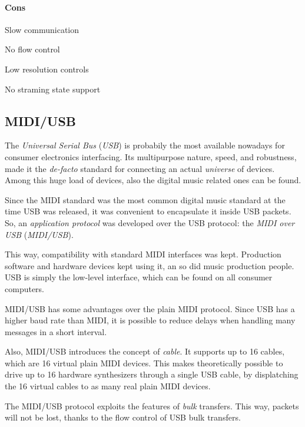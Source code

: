\documentclass[a4paper,10pt]{article}
\begin{document}
\begin{multicols}{2}
\paragraph{Cons}
\begin{itemize*}
	\item Slow communication
	\item No flow control
	\item Low resolution controls
	\item No straming state support
\end{itemize*}


\subsection{MIDI/USB}

The \emph{Universal Serial Bus} (\emph{USB}) \CITEME is probabily the most
available nowadays for consumer electronics interfacing. Its multipurpose
nature, speed, and robustness, made it the \emph{de-facto} standard for
connecting an actual \emph{universe} of devices. Among this huge load of
devices, also the digital music related ones can be found.

Since the MIDI standard was the most common digital music standard at the time
USB was released, it was convenient to encapsulate it inside USB packets.
So, an \emph{application protocol} was developed over the USB protocol: the
\emph{MIDI over USB} (\emph{MIDI/USB}).

This way, compatibility with standard MIDI interfaces was kept. Production
software and hardware devices kept using it, an so did music production
people. USB is simply the low-level interface, which can be found on all
consumer computers.

MIDI/USB has some advantages over the plain MIDI protocol. Since USB has a
higher baud rate than MIDI, it is possible to reduce delays when handling
many messages in a short interval.

Also, MIDI/USB introduces the concept of \emph{cable}. It supports up to 16
cables, which are 16 virtual plain MIDI devices. This makes theoretically
possible to drive up to 16 hardware synthesizers through a single USB cable,
by displatching the 16 virtual cables to as many real plain MIDI devices.

The MIDI/USB protocol exploits the features of \emph{bulk} transfers. This
way, packets will not be lost, thanks to the flow control of USB bulk
transfers.


\end{multicols}
\end{document}
